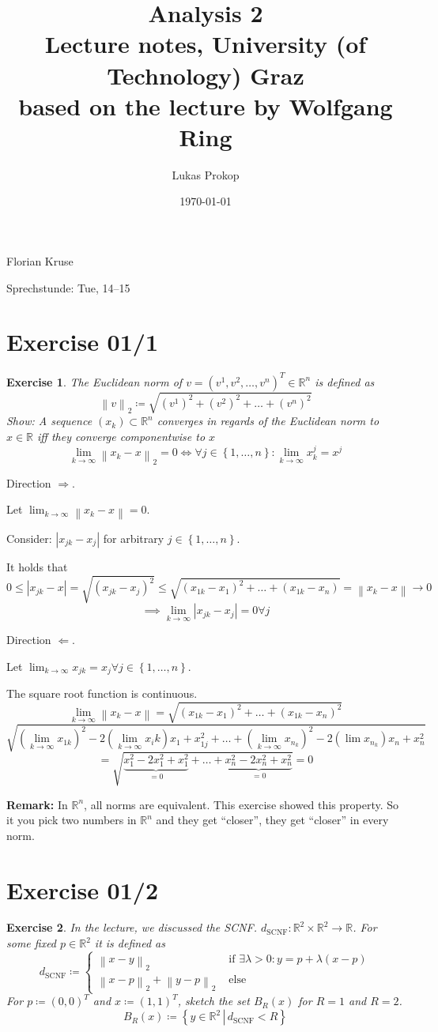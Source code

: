 \documentclass{article}
\title{
  Analysis 2 \\
  \large{Lecture notes, University (of Technology) Graz} \\
  based on the lecture by Wolfgang Ring
}
\date{\today}
\author{Lukas Prokop}
\newtheorem{ex}{Exercise} %
\newcommand{\set}[1]{\left\{#1\right\}}
\newcommand{\setdef}[2]{\left\{\left.#1\,\right|\,#2\right\}}
\newcommand{\norm}[1]{\left\|#1\right\|}
\newcommand{\card}[1]{\left|#1\right|}
\begin{document}
Florian Kruse

Sprechstunde: Tue, 14--15

\section{Exercise 01/1}

\begin{ex}
  The Euclidean norm of $v = (v^1, v^2, \dots, v^n)^T \in \mathbb R^n$ is defined as
  \[ \norm{v}_2 \coloneqq \sqrt{(v^1)^2 + (v^2)^2 + \ldots + (v^n)^2} \]
  Show: A sequence $(x_k) \subset \mathbb R^n$ converges in regards of the Euclidean norm to $x \in \mathbb R$ iff they converge componentwise to $x$
  \[ \lim_{k\to\infty} \norm{x_k - x}_2 = 0 \iff \forall j \in \set{1,\dots,n}: \lim_{k\to\infty} x_k^j = x^j \]
\end{ex}

Direction $\Rightarrow$.

Let $\lim_{k \to \infty} \norm{x_k - x} = 0$.

Consider: $\card{x_{jk} - x_j}$ for arbitrary $j \in \set{1,\dots,n}$.

It holds that
\[ 0 \leq \card{x_{jk} - x} = \sqrt{(x_{jk} - x_j)^2} \leq \sqrt{(x_{1k} - x_1)^2 + \dots + (x_{1k} - x_n)} = \norm{x_k - x} \to 0 \]
\[ \implies \lim_{k\to\infty} \card{x_{jk} - x_j} = 0 \forall j \]

Direction $\Leftarrow$.

Let $\lim_{k\to\infty} x_{jk} = x_j \forall j \in \set{1,\dots,n}$.

The square root function is continuous.
\[ \lim_{k\to\infty} \norm{x_k - x} = \sqrt{(x_{1k} - x_1)^2 + \dots + (x_{1k} - x_n)^2} \]
\[ \sqrt{(\lim_{k\to\infty} x_{1k})^2 - 2 (\lim_{k\to\infty} x_i k) x_1 + x_{1j}^2 + \dots + (\lim_{k\to\infty} x_{n_k})^2 - 2 (\lim{x_{n_k}}) x_n + x_n^2} \]
\[ = \sqrt{\underbrace{x_1^2 - 2x_1^2 + x_1^2}_{= 0} + \dots + \underbrace{x_n^2 - 2x_n^2 + x_n^2}_{= 0}} = 0 \]

\textbf{Remark:}
In $\mathbb R^n$, all norms are equivalent.
This exercise showed this property.
So it you pick two numbers in $\mathbb R^n$ and they get \enquote{closer}, they get \enquote{closer} in every norm.

\section{Exercise 01/2}

\begin{ex}
  In the lecture, we discussed the SCNF. $d_{\text{SCNF}}: \mathbb R^2 \times \mathbb R^2 \to \mathbb R$.
  For some fixed $p \in \mathbb R^2$ it is defined as
  \[
    d_{\text{SCNF}} \coloneqq \begin{cases}
      \norm{x - y}_2 & \text{ if } \exists \lambda > 0: y = p + \lambda (x - p) \\
      \norm{x - p}_2 + \norm{y - p}_2 & \text{ else}
    \end{cases}
  \]
  For $p \coloneqq (0,0)^T$ and $x \coloneqq (1,1)^T$, sketch the set $B_R(x)$ for $R=1$ and $R=2$.
  \[ B_R(x) \coloneqq \setdef{y \in \mathbb R^2}{d_{\text{SCNF}} < R} \]
\end{ex}
\end{document}
